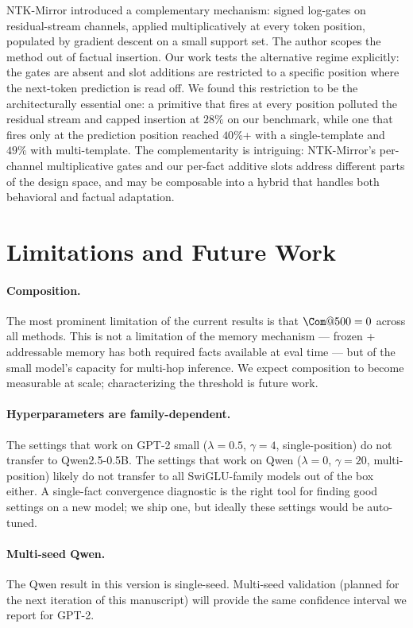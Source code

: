 \documentclass[11pt,a4paper]{article}
\begin{document}
NTK-Mirror \citep{chlon2026ntkmirror} introduced a complementary
mechanism: signed log-gates on residual-stream channels, applied
multiplicatively at every token position, populated by gradient descent
on a small support set. The author scopes the method out of factual
insertion. Our work tests the alternative regime explicitly: the gates
are absent and slot additions are restricted to a specific position
where the next-token prediction is read off. We found this restriction
to be the architecturally essential one: a primitive that fires at
every position polluted the residual stream and capped insertion at
$28\%$ on our benchmark, while one that fires only at the prediction
position reached $40\%$+ with a single-template and $49\%$ with
multi-template. The complementarity is intriguing: NTK-Mirror's
per-channel multiplicative gates and our per-fact additive slots
address different parts of the design space, and may be composable
into a hybrid that handles both behavioral and factual adaptation.

\section{Limitations and Future Work}

\paragraph{Composition.} The most prominent limitation of the current
results is that $\Com@500 = 0$ across all methods. This is not a
limitation of the memory mechanism --- frozen + addressable memory has
both required facts available at eval time --- but of the small
model's capacity for multi-hop inference. We expect composition to
become measurable at scale; characterizing the threshold is future
work.

\paragraph{Hyperparameters are family-dependent.} The settings that work
on GPT-2 small ($\lambda = 0.5$, $\gamma = 4$, single-position) do not
transfer to Qwen2.5-0.5B. The settings that work on Qwen ($\lambda = 0$,
$\gamma = 20$, multi-position) likely do not transfer to all
SwiGLU-family models out of the box either. A single-fact convergence
diagnostic is the right tool for finding good settings on a new model;
we ship one, but ideally these settings would be auto-tuned.

\paragraph{Multi-seed Qwen.} The Qwen result in this version is
single-seed. Multi-seed validation (planned for the next iteration of
this manuscript) will provide the same confidence interval we report
for GPT-2.
\end{document}
